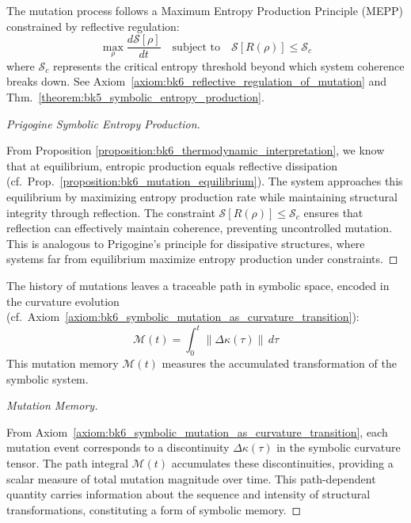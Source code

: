 \begin{proposition}
\label{proposition:bk6_thermodynamic_interpretation}
The mutation process follows a Maximum Entropy Production Principle (MEPP) constrained by reflective regulation:
\begin{equation}
\max_{\rho} \frac{d\mathcal{S}[\rho]}{dt} \quad \text{subject to} \quad \mathcal{S}[R(\rho)] \leq \mathcal{S}_c
\end{equation}
where $\mathcal{S}_c$ represents the critical entropy threshold beyond which system coherence breaks down.
See Axiom~\ref{axiom:bk6_reflective_regulation_of_mutation} and Thm.~\ref{theorem:bk5_symbolic_entropy_production}.
\begin{proof}[Prigogine Symbolic Entropy Production]
\label{proof:bk6_prigogine_symbolic_entropy_production}
\leavevmode

From Proposition \ref{proposition:bk6_thermodynamic_interpretation}, we know that at equilibrium, entropic production equals reflective dissipation (cf.~Prop.~\ref{proposition:bk6_mutation_equilibrium}). The system approaches this equilibrium by maximizing entropy production rate while maintaining structural integrity through reflection. The constraint $\mathcal{S}[R(\rho)] \leq \mathcal{S}_c$ ensures that reflection can effectively maintain coherence, preventing uncontrolled mutation. This is analogous to Prigogine's principle for dissipative structures, where systems far from equilibrium maximize entropy production under constraints.
\end{proof}
\end{proposition}
\begin{corollary}
\label{corollary:bk6_mutation_memory}
The history of mutations leaves a traceable path in symbolic space, encoded in the curvature evolution (cf.~Axiom~\ref{axiom:bk6_symbolic_mutation_as_curvature_transition}):
\begin{equation}
\mathcal{M}(t) = \int_0^t \|\Delta\kappa(\tau)\| \, d\tau
\end{equation}
This mutation memory $\mathcal{M}(t)$ measures the accumulated transformation of the symbolic system.
\begin{proof}[Mutation Memory]
\label{proof:bk6_mutation_memory}
\leavevmode

From Axiom~\ref{axiom:bk6_symbolic_mutation_as_curvature_transition}, each mutation event corresponds to a discontinuity $\Delta\kappa(\tau)$ in the symbolic curvature tensor. The path integral $\mathcal{M}(t)$ accumulates these discontinuities, providing a scalar measure of total mutation magnitude over time. This path-dependent quantity carries information about the sequence and intensity of structural transformations, constituting a form of symbolic memory.
\end{proof}
\end{corollary}
